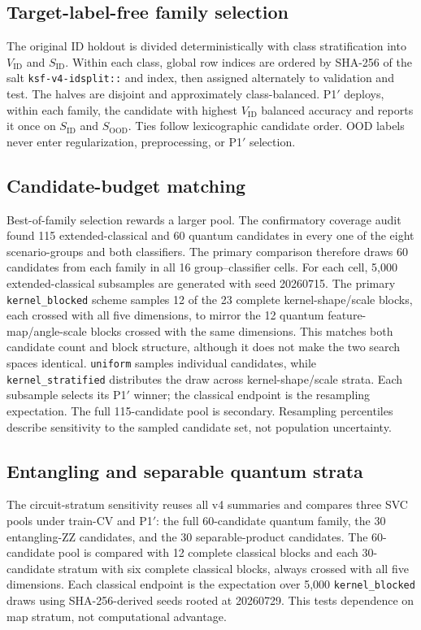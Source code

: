 \documentclass[referee,lineno,pdflatex,sn-nature]{sn-jnl}
\theoremstyle{thmstyleone}%
\theoremstyle{thmstyletwo}%
\theoremstyle{thmstylethree}%
\begin{document}
\subsection{Target-label-free family selection}

The original ID holdout is divided deterministically with class stratification into $V_{\mathrm{ID}}$ and $S_{\mathrm{ID}}$. Within each class, global row indices are ordered by SHA-256 of the salt \texttt{ksf-v4-idsplit::} and index, then assigned alternately to validation and test. The halves are disjoint and approximately class-balanced. P1$'$ deploys, within each family, the candidate with highest $V_{\mathrm{ID}}$ balanced accuracy and reports it once on $S_{\mathrm{ID}}$ and $S_{\mathrm{OOD}}$. Ties follow lexicographic candidate order. OOD labels never enter regularization, preprocessing, or P1$'$ selection.

\subsection{Candidate-budget matching}

Best-of-family selection rewards a larger pool. The confirmatory coverage audit found 115 extended-classical and 60 quantum candidates in every one of the eight scenario-groups and both classifiers. The primary comparison therefore draws 60 candidates from each family in all 16 group--classifier cells. For each cell, 5,000 extended-classical subsamples are generated with seed 20260715. The primary \texttt{kernel\_blocked} scheme samples 12 of the 23 complete kernel-shape/scale blocks, each crossed with all five dimensions, to mirror the 12 quantum feature-map/angle-scale blocks crossed with the same dimensions. This matches both candidate count and block structure, although it does not make the two search spaces identical. \texttt{uniform} samples individual candidates, while \texttt{kernel\_stratified} distributes the draw across kernel-shape/scale strata. Each subsample selects its P1$'$ winner; the classical endpoint is the resampling expectation. The full 115-candidate pool is secondary. Resampling percentiles describe sensitivity to the sampled candidate set, not population uncertainty.

\subsection{Entangling and separable quantum strata}

The circuit-stratum sensitivity reuses all v4 summaries and compares three SVC pools under train-CV and P1$'$: the full 60-candidate quantum family, the 30 entangling-ZZ candidates, and the 30 separable-product candidates. The 60-candidate pool is compared with 12 complete classical blocks and each 30-candidate stratum with six complete classical blocks, always crossed with all five dimensions. Each classical endpoint is the expectation over 5,000 \texttt{kernel\_blocked} draws using SHA-256-derived seeds rooted at 20260729. This tests dependence on map stratum, not computational advantage.
\end{document}
